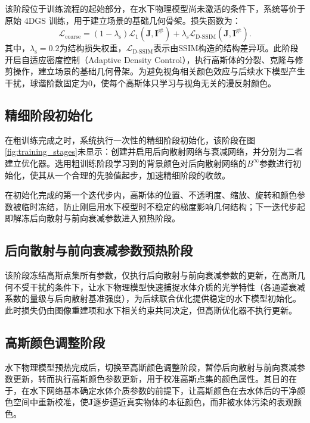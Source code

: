 该阶段位于训练流程的起始部分，在水下物理模型尚未激活的条件下，系统等价于原始 4DGS 训练，用于建立场景的基础几何骨架。损失函数为：
\begin{equation}
  \mathcal{L}_{\mathrm{coarse}} = (1-\lambda_{\mathrm{s}})\mathcal{L}_1(\mathbf{J}, \mathbf{I}^{\mathrm{gt}}) + \lambda_{\mathrm{s}} \mathcal{L}_{\mathrm{D}\mbox{-}\mathrm{SSIM}}(\mathbf{J}, \mathbf{I}^{\mathrm{gt}}).
  \label{eq:losscoarse}
\end{equation}
其中，$\lambda_{\mathrm{s}}=0.2$为结构损失权重，$\mathcal{L}_{\mathrm{D}\mbox{-}\mathrm{SSIM}}$表示由SSIM构造的结构差异项。此阶段开启自适应密度控制（Adaptive Density Control），执行高斯体的分裂、克隆与修剪操作，建立场景的基础几何骨架。为避免视角相关颜色效应与后续水下模型产生干扰，球谐阶数固定为0，使每个高斯体只学习与视角无关的漫反射颜色。

\subsection{精细阶段初始化}

在粗训练完成之时，系统执行一次性的精细阶段初始化，该阶段在图\ref{fig:training_stages}未显示：创建并启用后向散射网络与衰减网络，并分别为二者建立优化器。选用粗训练阶段学习到的背景颜色对后向散射网络的$B^{\infty}$参数进行初始化，使其从一个合理的先验值起步，加速精细阶段的收敛。

在初始化完成的第一个迭代步内，高斯体的位置、不透明度、缩放、旋转和颜色参数被临时冻结，防止刚启用水下模型时不稳定的梯度影响几何结构；下一迭代步起即解冻后向散射与前向衰减参数进入预热阶段。

\subsection{后向散射与前向衰减参数预热阶段}

该阶段冻结高斯点集所有参数，仅执行后向散射与前向衰减参数的更新，在高斯几何不受干扰的条件下，让水下物理模型快速捕捉水体介质的光学特性（各通道衰减系数的量级与后向散射基准强度），为后续联合优化提供稳定的水下模型初始化。此时损失仍由图像重建项和水下相关约束共同决定，但高斯优化器不执行更新。

\subsection{高斯颜色调整阶段}

水下物理模型预热完成后，切换至高斯颜色调整阶段，暂停后向散射与前向衰减参数更新，转而执行高斯颜色参数更新，用于校准高斯点集的颜色属性。其目的在于，在水下网络基本确定水体介质参数的前提下，让高斯颜色在去水体后的干净颜色空间中重新校准，使$\mathbf{J}$逐步逼近真实物体的本征颜色，而非被水体污染的表观颜色。

